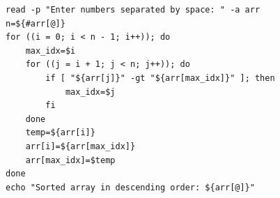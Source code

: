 \begin{verbatim}
read -p "Enter numbers separated by space: " -a arr
n=${#arr[@]}
for ((i = 0; i < n - 1; i++)); do
    max_idx=$i
    for ((j = i + 1; j < n; j++)); do
        if [ "${arr[j]}" -gt "${arr[max_idx]}" ]; then
            max_idx=$j
        fi
    done
    temp=${arr[i]}
    arr[i]=${arr[max_idx]}
    arr[max_idx]=$temp
done
echo "Sorted array in descending order: ${arr[@]}"
\end{verbatim}